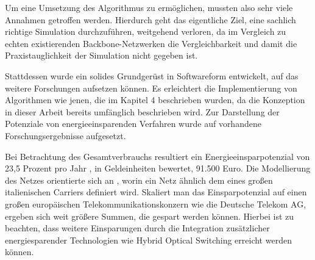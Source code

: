 Um eine Umsetzung des Algorithmus zu ermöglichen, mussten also sehr viele Annahmen getroffen werden. Hierdurch geht das eigentliche Ziel, eine sachlich richtige Simulation durchzuführen, weitgehend verloren, da im Vergleich zu echten existierenden Backbone-Netzwerken die Vergleichbarkeit und damit die Praxistauglichkeit der Simulation nicht gegeben ist.

Stattdessen wurde ein solides Grundgerüst in Softwareform entwickelt, auf das weitere Forschungen aufsetzen können. Es erleichtert die Implementierung von Algorithmen wie jenen, die im Kapitel 4 beschrieben wurden, da die Konzeption in dieser Arbeit bereits umfänglich beschrieben wird. Zur Darstellung der Potenziale von energieeinsparenden Verfahren wurde auf vorhandene Forschungsergebnisse aufgesetzt.

Bei Betrachtung des Gesamtverbrauchs resultiert ein Energieeinsparpotenzial von 23,5 Prozent pro Jahr  \cite[5]{Chiaraviglio2009}, in Geldeinheiten\cite{Proteus2016} bewertet, 91.500 Euro. Die Modellierung des Netzes orientierte sich an \cite{Chiaraviglio2009}, worin ein Netz ähnlich dem eines großen italienischen Carriers definiert wird. Skaliert man das Einsparpotenzial auf einen großen europäischen Telekommunikationskonzern wie die Deutsche Telekom AG, ergeben sich weit größere Summen, die gespart werden können. Hierbei ist zu beachten, dass weitere Einsparungen durch die Integration zusätzlicher energiesparender Technologien wie Hybrid Optical Switching erreicht werden können.